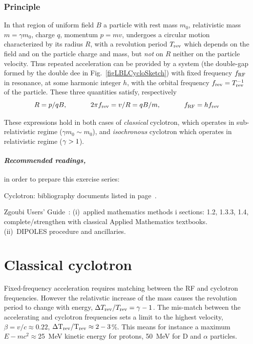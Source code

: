 \subsubsection*{Principle}

In that region of uniform field $B$ a  particle with rest mass $m_0$, 
relativistic mass $m=\gamma m_0$, charge $q$, momentum $p=mv$, undergoes a circular motion
characterized by its radius $R$, with a revolution period $T_{\rm rev}$ which depends on the field 
and on the particle charge and mass, but \emph{not} on $R$ neither on the particle velocity. 
Thus repeated acceleration can be provided by a system (the double-gap formed by the double dee in Fig.~\ref{figLBLCycloSketch}) 
with fixed frequency $f_{\rm RF}$ in resonance, at some harmonic integer $h$, 
 with the orbital frequency $f_{\rm rev}=T^{-1}_{\rm rev}$ of the particle. These three quantities satisfy, respectively 
\begin{equation}
\label{EqRCyclo}
 R = p / qB, \hspace{.1\linewidth} 2\pi f_{\rm rev} = v/R = q B / m, \hspace{.1\linewidth} f_{\rm RF} = h f_{\rm rev}
\end{equation}

These expressions hold in both cases of  \emph{classical} cyclotron, which  operates in 
 sub-relativistic regime ($\gamma m_0\sim m_0$), 
and  \emph{isochronous} cyclotron which operates in  relativistic regime ($\rm \gamma >1$).  


\paragraph {\sl Recommended readings,} in order to prepare this exercise series:

Cyclotron: bibliography documents listed in page~\pageref{SecBiblioCyclotron}.

Zgoubi Users' Guide~: (i)~applied mathematics methods i sections: 1.2, 1.3.3, 1.4,  
complete/strengthen with classical Applied Mathematics textbooks. (ii)~DIPOLES procedure and ancillaries.



\section{Classical cyclotron \label{secCycloClass}}

Fixed-frequency acceleration requires  matching between the RF and cyclotron frequencies. 
However the relativstic increase of the mass causes 
 the revolution period to change with energy, $\Delta T_{\rm rev}/T_{\rm rev} = \gamma-1 $.  
The mis-match between the accelerating and cyclotron frequencies 
sets a limit to the highest velocity, $\beta=v/c\approx 0.22$,  $\rm \Delta T_{\rm rev}/T_{\rm rev} \approx 2-3$\%.  
This means for instance 
a maximum $E-mc^2 \approx$25~MeV kinetic energy for protons, 50~MeV for D and $\alpha$ particles. 

